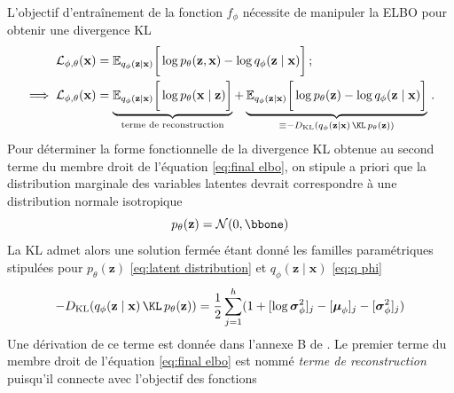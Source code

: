 L'objectif d'entraînement de la fonction $f_\phi$ nécessite de manipuler la ELBO pour obtenir une 
divergence KL
\begin{align}
        \mathcal{L}_{\phi,\theta}(\mathbf{x}) &= \mathbb{E}_{q_\phi(\mathbf{z} \mid \mathbf{x})} \bigg[ \log p_\theta(\mathbf{z}, \mathbf{x}) - \log q_\phi (\mathbf{z} \mid \mathbf{x}) \bigg]\, ; \\
        \label{eq:final elbo}
         \implies \mathcal{L}_{\phi,\theta}(\mathbf{x})  &= 
         \underbrace{\mathbb{E}_{q_\phi(\mathbf{z} \mid \mathbf{x})} \bigg[ \log p_\theta(\mathbf{x} \mid \mathbf{z})\bigg]}_{\text{terme de reconstruction}}
         + \underbrace{
                \mathbb{E}_{q_\phi(\mathbf{z} \mid \mathbf{x})} \bigg[\log p_{\theta}(\mathbf{z}) - \log q_\phi (\mathbf{z} \mid \mathbf{x}) \bigg]
        }_{\equiv -D_{\mathrm{KL}}(q_\phi(\mathbf{z} \mid \mathbf{x})\, \KL\, p_\theta(\mathbf{z}))}\, .
\end{align} 
Pour déterminer la forme fonctionnelle de la divergence KL obtenue au second terme du membre droit de l'équation \eqref{eq:final elbo}, 
on stipule a priori que la distribution marginale des variables latentes 
devrait correspondre à une distribution normale isotropique
\begin{equation}\label{eq:latent distribution}
        p_{\theta}(\mathbf{z}) = \mathcal{N}(0, \bbone)
\end{equation}
La KL admet alors une solution fermée étant donné les familles paramétriques stipulées 
pour $p_\theta(\mathbf{z})$ \eqref{eq:latent distribution} et $q_\phi(\mathbf{z} \mid \mathbf{x})$ \eqref{eq:q phi}
\begin{equation}\label{eq:final KL}
        -D_{\mathrm{KL}}(q_\phi(\mathbf{z} \mid \mathbf{x})\, \KL\, p_\theta(\mathbf{z})) =
        \frac{1}{2}\sum_{j=1}^{h} (1 + [\log \boldsymbol{ \sigma}_\phi^{2} ]_j - [\boldsymbol{ \mu}_\phi ]_j - [\boldsymbol{ \sigma}_\phi^{2} ]_j)
\end{equation} 
Une dérivation de ce terme est donnée dans l'annexe B de \citet{Kingma2013}. 
Le premier terme du membre droit de l'équation \eqref{eq:final elbo} 
est nommé \textit{terme de reconstruction} puisqu'il connecte avec l'objectif des fonctions 
